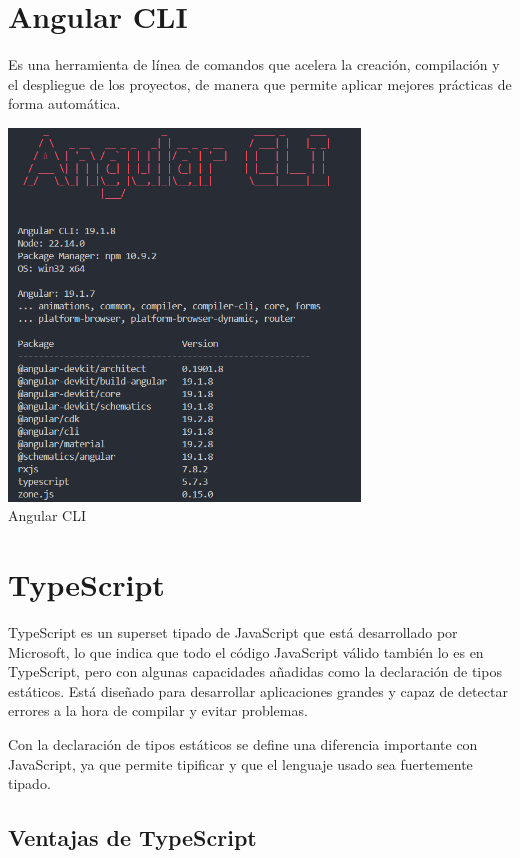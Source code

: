 \section{Angular CLI}\label{angular-cli}
Es una herramienta de línea de comandos que acelera la creación, compilación y el despliegue de los proyectos, de manera que permite aplicar mejores prácticas de forma automática.

\begin{center}
  \includegraphics[width=0.7\textwidth]{img/angular-cli.png}\\
  \small Angular CLI
\end{center}

\section{TypeScript}\label{typescript}
TypeScript es un superset tipado de JavaScript que está desarrollado por Microsoft, lo que indica que todo el código JavaScript válido también lo es en TypeScript, pero con algunas capacidades añadidas como la declaración de tipos estáticos. Está diseñado para desarrollar aplicaciones grandes y capaz de detectar errores a la hora de compilar y evitar problemas.

Con la declaración de tipos estáticos se define una diferencia importante con JavaScript, ya que permite tipificar y que el lenguaje usado sea fuertemente tipado.

\subsection{Ventajas de TypeScript}

